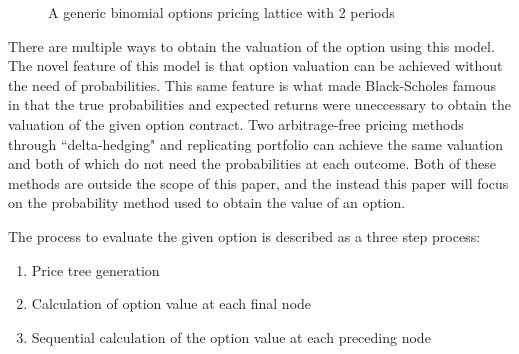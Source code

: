 \documentclass[12pt, letterpaper]{article}
\begin{document}
\begin{figure}[H]
  \caption{A generic binomial options pricing lattice with 2 periods}
  \label{fig:genericlattice}
\end{figure}

\pagebreak
There are multiple ways to obtain the valuation of the option using this model.
The novel feature of this model is that option valuation can be achieved without the need of probabilities.
This same feature is what made Black-Scholes famous in that the true probabilities and expected returns were uneccessary to obtain the valuation of the given option contract\cite{brigidavideo}.
Two arbitrage-free pricing methods through ``delta-hedging" and replicating portfolio can achieve the same valuation and both of which do not need the probabilities at each outcome.
Both of these methods are outside the scope of this paper, and the instead this paper will focus on the probability method used to obtain the value of an option.

\bigskip

The process to evaluate the given option is described as a three step process\cite{bopmwikipedia}:
\begin{enumerate}[leftmargin=2\parindent]
  \item Price tree generation
  \item Calculation of option value at each final node
  \item Sequential calculation of the option value at each preceding node
\end{enumerate}
\end{document}
